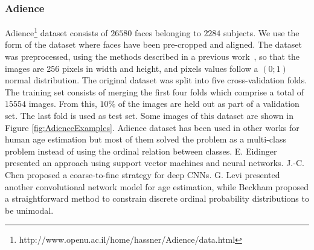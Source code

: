 \documentclass[journal]{IEEEtran}
\begin{document}
		
		
	\subsubsection{Adience}
	Adience\footnote{http://www.openu.ac.il/home/hassner/Adience/data.html} dataset consists of $26580$ faces belonging to $2284$ subjects. We use the form of the dataset where faces have been pre-cropped and aligned. The dataset was preprocessed, using the methods described in a previous work~\cite{beckham2017unimodal}, so that the images are 256 pixels in width and height, and pixels values follow a $(0;1)$ normal distribution. The original dataset was split into five cross-validation folds. The training set consists of merging the first four folds which comprise a total of $15554$ images. From this, $10\%$ of the images are held out as part of a validation set. The last fold is used as test set. Some images of this dataset are shown in Figure \ref{fig:AdienceExamples}. Adience dataset has been used in other works for human age estimation but most of them solved the problem as a multi-class problem instead of using the ordinal relation between classes. E. Eidinger \cite{eidinger2014age} presented an approach using support vector machines and neural networks. J.-C. Chen \cite{chen2016cascaded} proposed a coarse-to-fine strategy for deep CNNs. G. Levi \cite{levi2015age} presented another convolutional network model for age estimation, while Beckham \cite{beckham2017unimodal} proposed a straightforward method to constrain discrete ordinal probability distributions to be unimodal.
		
\end{document}
